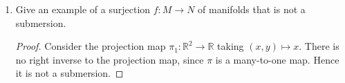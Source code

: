 \documentclass{article}
\begin{document}
\begin{enumerate}
\begin{proof}
		Since we are working in $\mathbb{R}^2$, then $x^1 =x$ and $x^2=y$. Define $X:= x \frac{\partial}{\partial x} + y \frac{\partial}{\partial y}$
		so $X^1 = x$ and $X^2 = y$. Similarly $Y:= y \frac{\partial}{\partial x} - x \frac{\partial}{\partial y}$ has $Y^1 = y$ and $Y^2 = -x$.
		So applying the formula for the Lie bracket, we get
		that the term in front of $\partial / \partial x$ should be
		\[ \left (x \frac{\partial y}{\partial x} - y \frac{\partial x}{\partial x} \right ) + \left (y \frac{\partial y}{\partial y} + x \frac{\partial x}{\partial y} \right)  \]	
		which simplifies to 
		\[ 0 - y + y +0 = 0 \]
		and the term in front of $\partial /\partial y$ should be
		\[  \left ( x\frac{\partial (-x)}{\partial x} - y \frac{\partial y}{\partial x} \right ) +  \left ( y \frac{\partial (-x)}{\partial y} + x \frac{\partial y}{\partial y} \right )  \]
		which simplifies to 
		\[ -x - 0 + 0 + x = 0.\]
		Thus
		\[ [X,Y] = 0 .\]
%
	\end{proof}
	
	\item Give an example of a surjection $f: M \rightarrow N$ of manifolds that is not a submersion.
	\begin{proof}
		Consider the projection map $\pi_1: \mathbb{R}^2 \rightarrow \mathbb{R}$ taking $(x,y) \mapsto x$. There is no right inverse to the projection map, since $\pi$ is a many-to-one map. Hence it is not a submersion.
	\end{proof}
	 
\end{enumerate}
\end{document}
